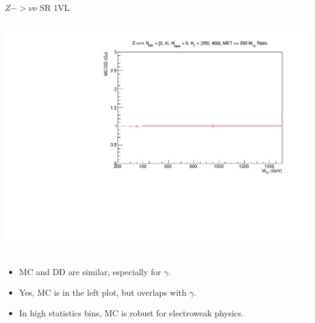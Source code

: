 \documentclass{beamer}
\begin{document}
\begin{frame}{$Z->\nu\nu$ SR 1VL}
\begin{columns}
\begin{column}{0.3\textwidth}
\begin{flushright}\includegraphics[scale=0.2]{PDFs/zinv_ratio_gj_1VL}\end{flushright}
\end{column}
\end{columns}
\begin{itemize}
\item MC and DD are similar, especially for $\gamma$.
\item Yes, MC is in the left plot, but overlaps with $\gamma$.
\item In high statistics bins, MC is robust for electroweak physics.
\end{itemize}
\end{frame}
\end{document}
